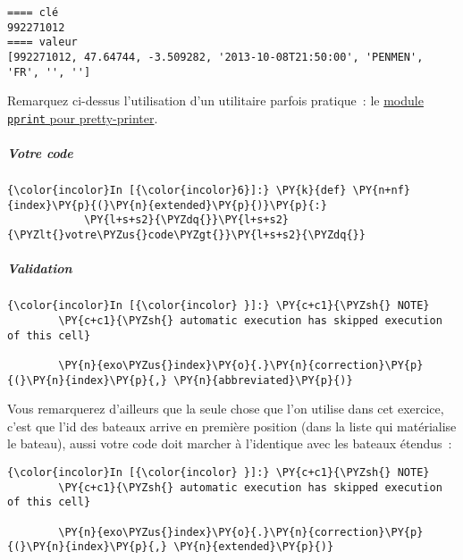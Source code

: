     \begin{Verbatim}[commandchars=\\\{\}]
==== clé
992271012
==== valeur
[992271012, 47.64744, -3.509282, '2013-10-08T21:50:00', 'PENMEN', 'FR', '', '']

    \end{Verbatim}

    Remarquez ci-dessus l'utilisation d'un utilitaire parfois pratique~: le
\href{https://docs.python.org/3/library/pprint.html}{module
\texttt{pprint} pour pretty-printer}.

    \hypertarget{votre-code}{%
\subparagraph{Votre code}\label{votre-code}}

    \begin{Verbatim}[commandchars=\\\{\}]
{\color{incolor}In [{\color{incolor}6}]:} \PY{k}{def} \PY{n+nf}{index}\PY{p}{(}\PY{n}{extended}\PY{p}{)}\PY{p}{:}
            \PY{l+s+s2}{\PYZdq{}}\PY{l+s+s2}{\PYZlt{}votre\PYZus{}code\PYZgt{}}\PY{l+s+s2}{\PYZdq{}}
\end{Verbatim}


    \hypertarget{validation}{%
\subparagraph{Validation}\label{validation}}

    \begin{Verbatim}[commandchars=\\\{\}]
{\color{incolor}In [{\color{incolor} }]:} \PY{c+c1}{\PYZsh{} NOTE}
        \PY{c+c1}{\PYZsh{} automatic execution has skipped execution of this cell}
        
        \PY{n}{exo\PYZus{}index}\PY{o}{.}\PY{n}{correction}\PY{p}{(}\PY{n}{index}\PY{p}{,} \PY{n}{abbreviated}\PY{p}{)}
\end{Verbatim}


    Vous remarquerez d'ailleurs que la seule chose que l'on utilise dans cet
exercice, c'est que l'id des bateaux arrive en première position (dans
la liste qui matérialise le bateau), aussi votre code doit marcher à
l'identique avec les bateaux étendus~:

    \begin{Verbatim}[commandchars=\\\{\}]
{\color{incolor}In [{\color{incolor} }]:} \PY{c+c1}{\PYZsh{} NOTE}
        \PY{c+c1}{\PYZsh{} automatic execution has skipped execution of this cell}
        
        \PY{n}{exo\PYZus{}index}\PY{o}{.}\PY{n}{correction}\PY{p}{(}\PY{n}{index}\PY{p}{,} \PY{n}{extended}\PY{p}{)}
\end{Verbatim}


